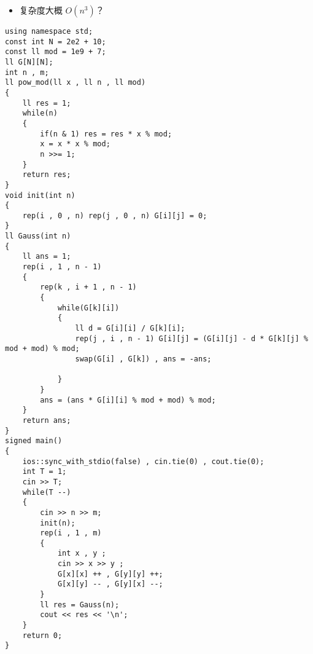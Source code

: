 \documentclass[E:/GsjzTle/main/main.tex]{subfiles}
\begin{document}
\begin{itemize}
\item
  复杂度大概 \(O(n^3)\)？
\end{itemize}

\begin{lstlisting}
using namespace std;
const int N = 2e2 + 10;
const ll mod = 1e9 + 7;
ll G[N][N];
int n , m;
ll pow_mod(ll x , ll n , ll mod)
{
	ll res = 1;
	while(n)
	{
		if(n & 1) res = res * x % mod;
		x = x * x % mod;
		n >>= 1;
	}
	return res;
}
void init(int n)
{
	rep(i , 0 , n) rep(j , 0 , n) G[i][j] = 0;
}
ll Gauss(int n)
{
	ll ans = 1;
	rep(i , 1 , n - 1)
	{
		rep(k , i + 1 , n - 1)
		{
			while(G[k][i])
			{
				ll d = G[i][i] / G[k][i];
				rep(j , i , n - 1) G[i][j] = (G[i][j] - d * G[k][j] % mod + mod) % mod;
				swap(G[i] , G[k]) , ans = -ans;
				
			}
		}
		ans = (ans * G[i][i] % mod + mod) % mod;
	}
	return ans;
}
signed main()
{
	ios::sync_with_stdio(false) , cin.tie(0) , cout.tie(0);
	int T = 1;
	cin >> T;
	while(T --)
	{
		cin >> n >> m;
		init(n);
		rep(i , 1 , m)
		{
			int x , y ;
			cin >> x >> y ;
			G[x][x] ++ , G[y][y] ++;
			G[x][y] -- , G[y][x] --;
		}
		ll res = Gauss(n);
		cout << res << '\n';
	}
	return 0;
}
\end{lstlisting}
\end{document}
